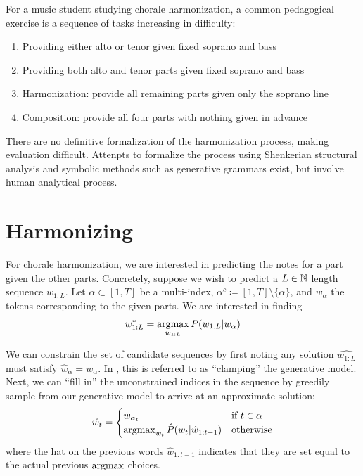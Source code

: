 For a music student studying chorale harmonization, a common pedagogical
exercise \citep{denny1960oxford}\citep{piston1978harmony} is a sequence of tasks increasing in difficulty:
\begin{enumerate}
  \item Providing either alto or tenor given fixed soprano and bass
  \item Providing both alto and tenor parts given fixed soprano and bass
  \item Harmonization: provide all remaining parts given only the soprano line
  \item Composition: provide all four parts with nothing given in advance
\end{enumerate}

There are no definitive formalization of the harmonization process, making
evaluation difficult. Attenpts to formalize the process using Shenkerian
structural analysis \citep{schenker1954harmony} and symbolic methods such as
generative grammars \citep{lerdahl1983jackendoff}\citep{winograd1968linguistics}
exist, but involve human analytical process.

\section{Harmonizing}

For chorale harmonization, we are interested in predicting the notes for a part
given the other parts. Concretely, suppose we wish to predict a $L \in \mathbb{N}$
length sequence $w_{1:L}$. Let $\alpha \subset [1,T]$ be a multi-index,
$\alpha^c \coloneqq [1,T] \setminus \{\alpha\}$, and $w_\alpha$ the tokens
corresponding to the given parts. We are interested in finding
\begin{equation}
  w_{1:L}^* = \operatorname*{argmax}_{w_{1:L}} P(w_{1:L} | w_{\alpha})
\end{equation}

We can constrain the set of candidate sequences by first noting any solution
$\hat{w_{1:L}}$ must satisfy $\hat{w}_\alpha = w_\alpha$. In
\citet{hinton1986learning}, this is referred to as ``clamping'' the generative
model. Next, we can ``fill in'' the unconstrained indices in the sequence by
greedily sample from our generative model to arrive at an approximate solution:
\begin{equation}
  \hat{w_{t}} = \begin{cases}
    w_{\alpha_t} &\text{if}~t \in \alpha \\
    \operatorname*{argmax}_{w_t} \hat{P}(w_t | \hat{w}_{1:t-1}) &\text{otherwise}
  \end{cases}
\end{equation}
where the hat on the previous words $\hat{w}_{1:t-1}$ indicates that they are
set equal to the actual previous $\operatorname*{argmax}$ choices.

